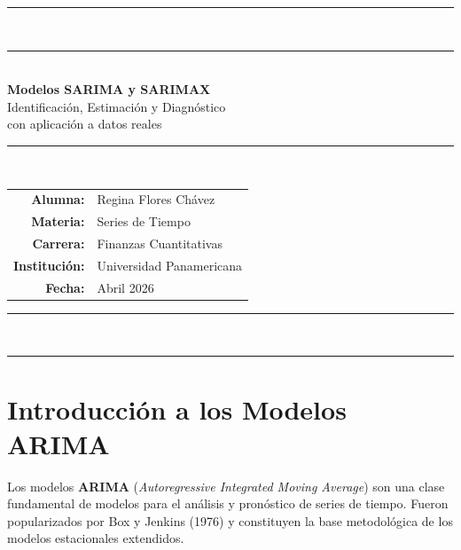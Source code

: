 \documentclass[12pt,a4paper]{article}
\begin{document}
\begin{titlepage}
  \centering
  \vspace*{1.5cm}

  {\color{upnavy}\rule{\linewidth}{2pt}}\\[0.4cm]
  {\color{upgold}\rule{\linewidth}{1pt}}\\[1.5cm]

  {\Huge\bfseries\color{upnavy} Modelos SARIMA y SARIMAX}\\[0.5cm]
  {\Large\color{accentblue} Identificación, Estimación y Diagnóstico}\\[0.3cm]
  {\large\color{gray} con aplicación a datos reales}

  \vspace{1.5cm}
  {\color{upgold}\rule{0.6\linewidth}{0.8pt}}\\[1.5cm]

  \begin{tabular}{rl}
    \textbf{\color{upnavy}Alumna:}   & Regina Flores Chávez \\[0.4em]
    \textbf{\color{upnavy}Materia:}  & Series de Tiempo \\[0.4em]
    \textbf{\color{upnavy}Carrera:}  & Finanzas Cuantitativas \\[0.4em]
    \textbf{\color{upnavy}Institución:} & Universidad Panamericana \\[0.4em]
    \textbf{\color{upnavy}Fecha:}    & Abril 2026 \\
  \end{tabular}

  \vfill
  {\color{upgold}\rule{0.6\linewidth}{0.8pt}}\\[0.8cm]
  {\color{upnavy}\rule{\linewidth}{2pt}}
\end{titlepage}

\tableofcontents
\newpage

\section{Introducción a los Modelos ARIMA}

Los modelos \textbf{ARIMA} (\textit{Autoregressive Integrated Moving Average}) son una clase
fundamental de modelos para el análisis y pronóstico de series de tiempo. Fueron
popularizados por Box y Jenkins (1976) y constituyen la base metodológica de los
modelos estacionales extendidos.
\end{document}
